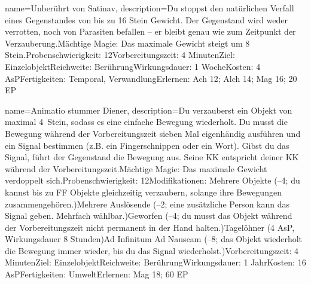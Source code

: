 {
    name={Unberührt von Satinav},
    description={Du stoppst den natürlichen Verfall eines Gegenstandes von bis zu 16 Stein Gewicht. Der Gegenstand wird weder verrotten, noch von Parasiten befallen – er bleibt genau wie zum Zeitpunkt der Verzauberung.\newline Mächtige Magie: Das maximale Gewicht steigt um 8 Stein.\newline Probenschwierigkeit: 12\newline Vorbereitungszeit: 4 Minuten\newline Ziel: Einzelobjekt\newline Reichweite: Berührung\newline Wirkungsdauer: 1 Woche\newline Kosten: 4 AsP\newline Fertigkeiten: Temporal, Verwandlung\newline Erlernen: Ach 12; Alch 14; Mag 16; 20 EP}
}


{
    name={Animatio stummer Diener},
    description={Du verzauberst ein Objekt von maximal 4 Stein, sodass es eine einfache Bewegung wiederholt. Du musst die Bewegung während der Vorbereitungszeit sieben Mal eigenhändig ausführen und ein Signal bestimmen (z.B. ein Fingerschnippen oder ein Wort). Gibst du das Signal, führt der Gegenstand die Bewegung aus. Seine KK entspricht deiner KK während der Vorbereitungszeit.\newline Mächtige Magie: Das maximale Gewicht verdoppelt sich.\newline Probenschwierigkeit: 12\newline Modifikationen:  Mehrere Objekte (–4; du kannst bis zu FF Objekte gleichzeitig verzaubern, solange ihre Bewegungen zusammengehören.)\newline Mehrere Auslösende (–2; eine zusätzliche Person kann das Signal geben. Mehrfach wählbar.)\newline Geworfen (–4; du musst das Objekt während der Vorbereitungszeit nicht permanent in der Hand halten.)\newline Tagelöhner (4 AsP, Wirkungsdauer 8 Stunden)\newline Ad Infinitum Ad Nauseam (–8; das Objekt wiederholt die Bewegung immer wieder, bis du das Signal wiederholst.)\newline Vorbereitungszeit: 4 Minuten\newline Ziel: Einzelobjekt\newline Reichweite: Berührung\newline Wirkungsdauer: 1 Jahr\newline Kosten: 16 AsP\newline Fertigkeiten: Umwelt\newline Erlernen: Mag 18; 60 EP}
}


